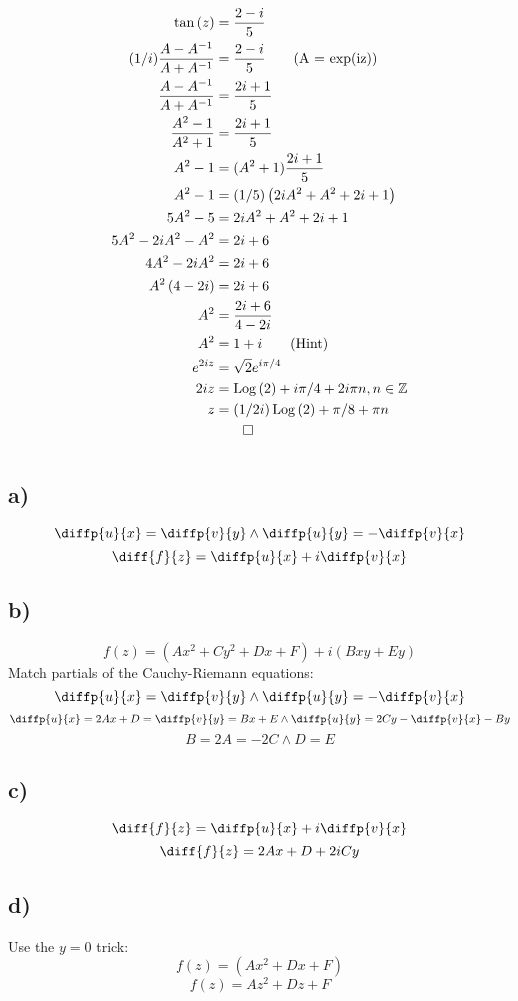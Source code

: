 \documentclass[12pt]{article}
\begin{document}
\section{}
\begin{align*}
	\tan{(z)} &= \dfrac{2-i}{5}\\
	(1/i) \dfrac{A-A^{-1}}{A+A^{-1}} &= \dfrac{2-i}{5} \tag{A = exp(iz)}\\
	\dfrac{A-A^{-1}}{A+A^{-1}} &= \dfrac{2i+1}{5}\\
	\dfrac{A^2-1}{A^2+1} &= \dfrac{2i+1}{5}\\
	A^2 - 1 &= (A^2+1)\dfrac{2i+1}{5}\\
	A^2 - 1 &= (1/5) \left(2iA^2+A^2 + 2i + 1\right)\\
	5A^2 -5 &= 2iA^2+A^2 + 2i + 1\\
	5A^2 - 2iA^2 -A^2 &= 2i + 6\\
	4A^2 - 2iA^2 &= 2i + 6\\
	A^2\left(4-2i\right) &= 2i + 6\\
	A^2 &= \dfrac{2i+6}{4-2i}\\
	A^2 &= 1+i \tag{Hint}\\
	e^{2iz} &= \sqrt{2}e^{i\pi/4}\\
	2iz &= \operatorname{Log}{(2)} + i\pi/4 + 2i\pi n, n\in\mathbb{Z}\\
	z &= (1/2i) \operatorname{Log}{(2)} + \pi/8 + \pi n\\
	&\qed
\end{align*}
\newpage

\section{}
\subsection{a)}
\[\diffp{u}{x} = \diffp{v}{y} \land \diffp{u}{y} = -\diffp{v}{x}\]
\[\diff{f}{z} = \diffp{u}{x} + i\diffp{v}{x}\]

\subsection{b)}
\[f(z) = (Ax^2 + Cy^2 + Dx + F) + i(Bxy + Ey)\]
Match partials of the Cauchy-Riemann equations:
\[\diffp{u}{x} = \diffp{v}{y} \land \diffp{u}{y} = -\diffp{v}{x}\]
\[\diffp{u}{x} = 2Ax + D = \diffp{v}{y} = Bx + E \land \diffp{u}{y} = 2Cy -\diffp{v}{x} -By\]
\[B = 2A = -2C\land D = E\]

\subsection{c)}
\[\diff{f}{z} = \diffp{u}{x} + i\diffp{v}{x}\]
\[\diff{f}{z} = 2Ax + D + 2iCy\]

\subsection{d)}
Use the $ y=0 $ trick:
\[f(z) = (Ax^2 + Dx + F)\]
\[f(z) = Az^2 + Dz + F\]
\end{document}
